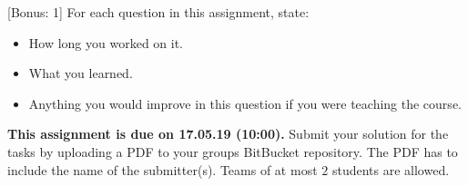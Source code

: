 \documentclass{exam}
\newcommand{\duedate}{17.05.19 (10:00)}
\newcommand{\due}{{\bf This assignment is due on \duedate.} }
\begin{document}
\begin{questions}
	
	[Bonus: 1]
	For each question in this assignment, state:
	\begin{itemize}
	\item How long you worked on it.
	\item What you learned.
	\item Anything you would improve in this question if you were teaching the course.
	\end{itemize}
	\end{questions}
	
	\noindent
	\due Submit your solution for the tasks by uploading a PDF to your groups BitBucket repository. The PDF has to include the name of the submitter(s). Teams of at most $2$ students are allowed.
\end{document}
